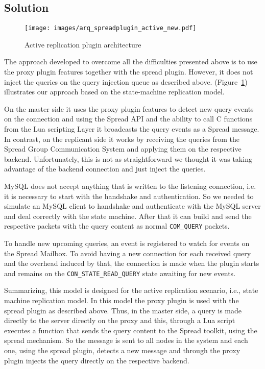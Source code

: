 \subsection{Solution}

\begin{figure}[t]
\centering    
\texttt{[image: images/arq\_spreadplugin\_active\_new.pdf]}
\caption{Active replication plugin architecture}
\label{fig:spread_plugin_active}
\end{figure}

The approach developed to overcome all the difficulties presented above is to use the proxy plugin features together with the spread plugin. However, it does not inject the queries on the query injection queue as described above. (Figure~\ref{fig:spread_plugin_active}) illustrates our approach based on the state-machine replication model. 

On the master side it uses the proxy plugin features to detect new query events on the connection and using the Spread API and the ability to call C functions from the Lua scripting Layer it broadcasts the query events as a Spread message. In contrast, on the replicant side it works by receiving the queries from the Spread Group Communication System and applying them on the respective backend. Unfortunately, this is not as straightforward we thought it was taking advantage of the backend connection and just inject the queries.

MySQL does not accept anything that is written to the listening connection, i.e. it is necessary to start with the handshake and authentication. So we needed to simulate an MySQL client to handshake and authenticate with the MySQL server and deal correctly with the state machine. After that it can build and send the respective packets with the query content as normal \texttt{COM\_QUERY} packets.

To handle new upcoming queries, an event is registered to watch for events on the Spread Mailbox. To avoid having a new connection for each received query and the overhead induced by that, the connection is made when the plugin starts and remains on the \texttt{CON\_STATE\_READ\_QUERY} state awaiting for new events.

Summarizing, this model is designed for the active replication scenario, i.e., state machine replication model. In this model the proxy plugin is used with the spread plugin as described above. Thus, in the master side, a query is made directly to the server directly on the proxy and this, through a Lua script executes a function that sends the query content to the Spread toolkit, using the spread mechanism. So the message is sent to all nodes in the system and each one, using the spread plugin, detects a new message and through the proxy plugin injects the query directly on the respective backend.



